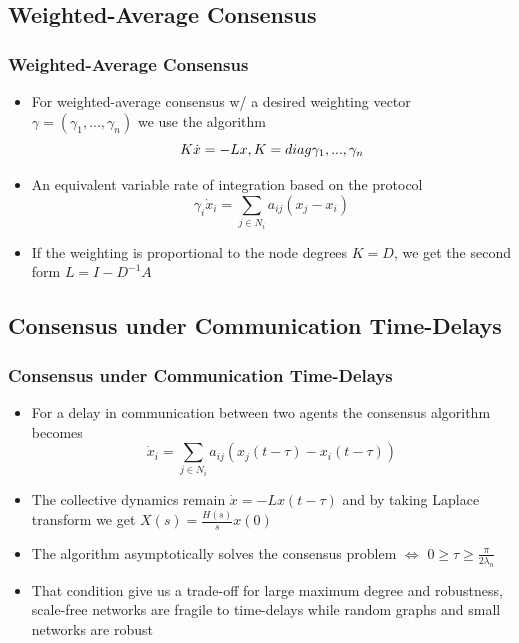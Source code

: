 \documentclass{beamer}
\begin{document}
\subsection{Weighted-Average Consensus}

\begin{frame}
\frametitle{Weighted-Average Consensus}
\begin{itemize}
\item For weighted-average consensus  w/ a desired weighting vector $\gamma=(\gamma_1,...,\gamma_n)$ we use the algorithm
\begin{equation*}
K\dot{x}=-Lx, \vspace{.2cm} K=diag{\gamma_1,...,\gamma_n}
\end{equation*} 
\item An equivalent variable rate of integration based on the protocol
\begin{equation*}
\gamma_i \dot{x}_i=\sum_{j \in N_i}a_{ij}(x_j-x_i)
\end{equation*}
\item If the weighting is proportional to the node degrees $K=D$, we get the second form $L=I-D^{-1}A$
\end{itemize}
\end{frame}

\subsection{Consensus under Communication Time-Delays}

\begin{frame}
\frametitle{Consensus under Communication Time-Delays}
\begin{itemize}
\item For a delay in communication between two agents the consensus algorithm becomes
\begin{equation*}
\dot{x}_i=\sum_{j \in N_i}a_{ij}(x_j(t-\tau)-x_i(t-\tau))
\end{equation*}
\item The collective dynamics remain $\dot{x}=-Lx(t-\tau)$ and by taking Laplace transform we get $X(s)= \frac{H(s)}{s}x(0)$
\item The algorithm asymptotically solves the consensus problem $\iff$ $0\geq \tau \geq \frac{\pi}{2\lambda_n}$
\item That condition give us a trade-off for large maximum degree and robustness, scale-free networks are fragile to time-delays while random graphs and small networks are robust
\end{itemize}
\end{frame}
\end{document}
